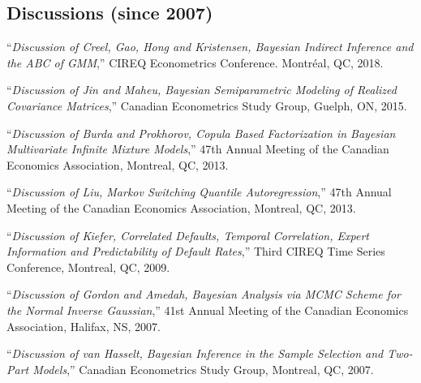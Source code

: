 \documentclass[12pt]{article}
\begin{document}

\subsection*{Discussions (since 2007)}

``{\it Discussion of Creel, Gao, Hong and Kristensen, Bayesian Indirect Inference and the ABC of GMM},''
CIREQ Econometrics Conference.
Montr\'eal, QC,
2018.

``{\it Discussion of Jin and Maheu, Bayesian Semiparametric Modeling of Realized Covariance Matrices},''
Canadian Econometrics Study Group,
Guelph, ON,
2015.

``{\it Discussion of Burda and Prokhorov, Copula Based Factorization in Bayesian Multivariate Infinite Mixture Models},''
47th Annual Meeting of the Canadian Economics Association,
Montreal, QC,
2013.

``{\it Discussion of Liu, Markov Switching Quantile Autoregression},''
47th Annual Meeting of the Canadian Economics Association,
Montreal, QC,
2013.

``{\it Discussion of Kiefer, Correlated Defaults, Temporal Correlation, Expert Information and Predictability of Default Rates},''
Third CIREQ Time Series Conference,
Montreal, QC,
2009.
 
``{\it Discussion of Gordon and Amedah, Bayesian Analysis via MCMC Scheme for the Normal Inverse Gaussian},''
41st Annual Meeting of the Canadian Economics Association,
Halifax, NS,
2007.

``{\it Discussion of van Hasselt, Bayesian Inference in the Sample Selection
and Two-Part Models},''
Canadian Econometrics Study Group,
Montreal, QC,
2007.




\end{document}
